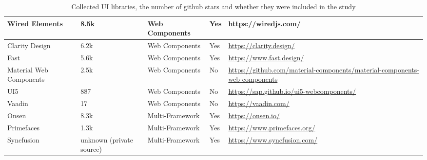 \begin{table*}[t]
\begin{tabularx}{\textwidth}{l|l|l|l|X}
		Wired Elements          & 8.5k                     & Web Components        & Yes               & \url{https://wiredjs.com/}                                                       \\ \hline
		Clarity Design          & 6.2k                     & Web Components        & Yes               & \url{https://clarity.design/}                                                    \\ \hline
		Fast                    & 5.6k                     & Web Components        & Yes               & \url{https://www.fast.design/}                                                   \\ \hline
		Material Web Components & 2.5k                     & Web Components        & No                & \url{https://github.com/material-components/material-components-web-components } \\ \hline
		UI5                     & 887                      & Web Components        & No                & \url{https://sap.github.io/ui5-webcomponents/}                                   \\ \hline
		Vaadin                  & 17                       & Web Components        & No                & \url{https://vaadin.com/}                                                        \\ \hline
		Onsen                   & 8.3k                     & Multi-Framework       & Yes               & \url{https://onsen.io/}                                                          \\ \hline
		Primefaces              & 1.3k                     & Multi-Framework       & Yes               & \url{https://www.primefaces.org/}                                                \\ \hline
		Syncfusion              & unknown (private source) & Multi-Framework       & Yes               & \url{https://www.syncfusion.com/}
	\end{tabularx}
	\caption{Collected UI libraries, the number of github stars and whether they were included in the study}
	\label{tab:design:ui-libraries}
\end{table*}

